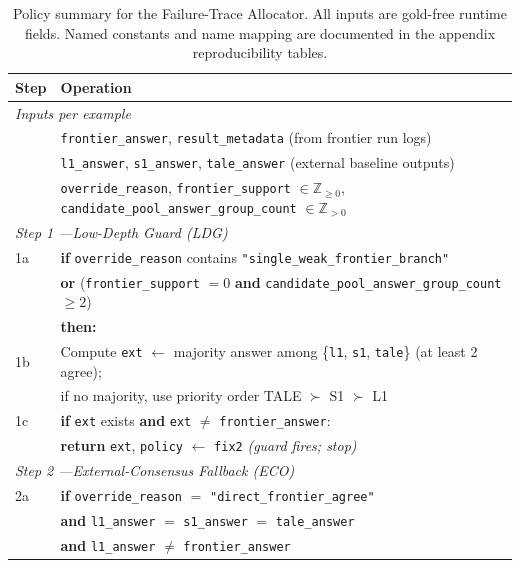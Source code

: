 \begin{table}[t]
\centering
\caption{Policy summary for the Failure-Trace Allocator. All inputs are gold-free runtime fields. Named constants and name mapping are documented in the appendix reproducibility tables.}
\label{alg:fix24}
\scriptsize
\begin{tabular}{p{} p{}}
\toprule
\textbf{Step} & \textbf{Operation} \\
\midrule
\multicolumn{2}{l}{\textit{Inputs per example}} \\
& \texttt{frontier\_answer}, \texttt{result\_metadata} (from frontier run logs) \\
& \texttt{l1\_answer}, \texttt{s1\_answer}, \texttt{tale\_answer} (external baseline outputs) \\
& \texttt{override\_reason}, \texttt{frontier\_support} $\in \mathbb{Z}_{\geq 0}$, \texttt{candidate\_pool\_answer\_group\_count} $\in \mathbb{Z}_{>0}$ \\
\midrule
\multicolumn{2}{l}{\textit{Step 1 ---Low-Depth Guard (LDG)}} \\
1a & \textbf{if} \texttt{override\_reason} contains \texttt{"single\_weak\_frontier\_branch"} \\
   & \quad \textbf{or} (\texttt{frontier\_support} $= 0$ \textbf{and} \texttt{candidate\_pool\_answer\_group\_count} $\geq 2$) \\
   & \textbf{then:} \\
1b & \quad Compute \texttt{ext} $\leftarrow$ majority answer among \{\texttt{l1}, \texttt{s1}, \texttt{tale}\} (at least 2 agree); \\
   & \quad if no majority, use priority order TALE $\succ$ S1 $\succ$ L1 \\
1c & \quad \textbf{if} \texttt{ext} exists \textbf{and} \texttt{ext} $\neq$ \texttt{frontier\_answer}: \\
   & \quad\quad \textbf{return} \texttt{ext}, \texttt{policy} $\leftarrow$ \texttt{fix2} \quad\quad \textit{(guard fires; stop)} \\
\midrule
\multicolumn{2}{l}{\textit{Step 2 ---External-Consensus Fallback (ECO)}} \\
2a & \textbf{if} \texttt{override\_reason} $=$ \texttt{"direct\_frontier\_agree"} \\
   & \quad \textbf{and} \texttt{l1\_answer} $=$ \texttt{s1\_answer} $=$ \texttt{tale\_answer} \\
   & \quad \textbf{and} \texttt{l1\_answer} $\neq$ \texttt{frontier\_answer} \\

\end{tabular}
\end{table}
